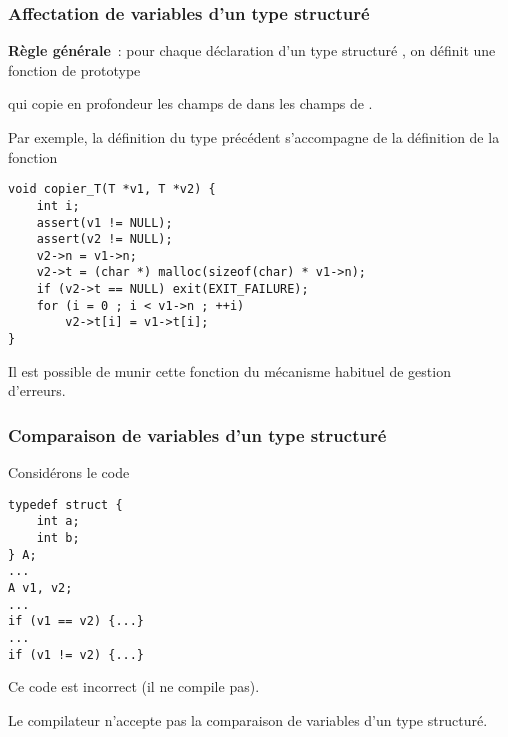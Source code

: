 \begin{frame}[fragile]
\frametitle{Affectation de variables d'un type structuré}
{\bf Règle générale}~: pour chaque déclaration d'un type structuré
, on définit une fonction de prototype
\begin{center}
\end{center}
qui \alert{copie en profondeur} les champs de  dans les champs
de .
\medskip

Par exemple, la définition du type  précédent s'accompagne de la
définition de la fonction
\begin{lstlisting}
void copier_T(T *v1, T *v2) {
    int i;
    assert(v1 != NULL);
    assert(v2 != NULL);
    v2->n = v1->n;
    v2->t = (char *) malloc(sizeof(char) * v1->n);
    if (v2->t == NULL) exit(EXIT_FAILURE);
    for (i = 0 ; i < v1->n ; ++i)
        v2->t[i] = v1->t[i];
}
\end{lstlisting}

Il est possible de munir cette fonction du mécanisme habituel de
gestion d'erreurs.
\end{frame}

\begin{frame}[fragile]
\frametitle{Comparaison de variables d'un type structuré}
Considérons le code
\begin{multicols}{2}
\begin{lstlisting}
typedef struct {
    int a;
    int b;
} A;
...
A v1, v2;
...
if (v1 == v2) {...}
...
if (v1 != v2) {...}
\end{lstlisting}
\end{multicols}
\medskip

Ce code est incorrect (il ne compile pas).
\medskip

Le compilateur n'accepte pas la comparaison de variables d'un type
structuré.
\smallskip

\smallskip

\end{frame}

